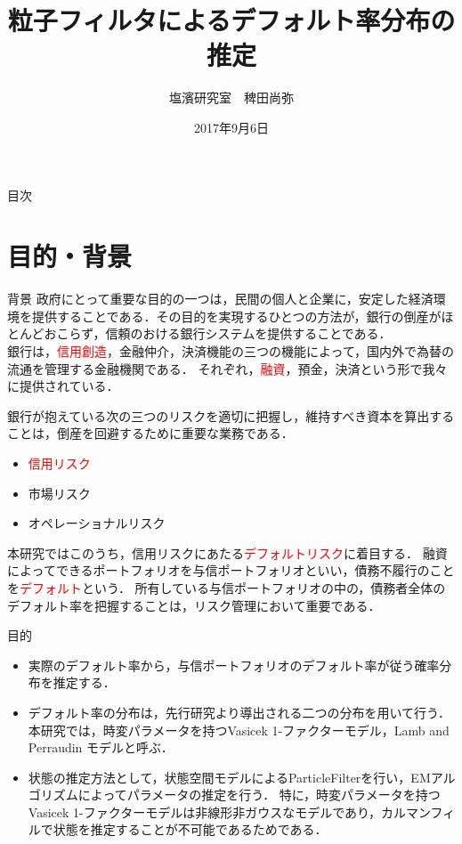 \documentclass[dvipdfmx]{beamer}
\title[タイトル]{粒子フィルタによるデフォルト率分布の推定}
\author[発表者名]{塩濱研究室　稗田尚弥}
\institute[所属]{東京理科大学大学院工学研究科経営工学専攻1年 \\ 学籍番号 4417621}
\date[日付]{2017年9月6日}
\begin{document}
\begin{frame}[plain]
\titlepage
\end{frame}


\begin{frame}{目次}
\tableofcontents
\end{frame}

\section{目的・背景}
\begin{frame}{背景}
政府にとって重要な目的の一つは，民間の個人と企業に，安定した経済環境を提供することである．その目的を実現するひとつの方法が，銀行の倒産がほとんどおこらず，信頼のおける銀行システムを提供することである．\\
銀行は，\textcolor{red}{信用創造}，金融仲介，決済機能の三つの機能によって，国内外で為替の流通を管理する金融機関である．
それぞれ，\textcolor{red}{融資}，預金，決済という形で我々に提供されている．\\
\end{frame}

\begin{frame}
銀行が抱えている次の三つのリスクを適切に把握し，維持すべき資本を算出することは，倒産を回避するために重要な業務である．
\begin{block}{}
\begin{itemize}
 \item \textcolor{red}{信用リスク} 
 \item 市場リスク 
 \item オペレーショナルリスク 
\end{itemize}
\end{block}
本研究ではこのうち，信用リスクにあたる\textcolor{red}{デフォルトリスク}に着目する．
融資によってできるポートフォリオを与信ポートフォリオといい，債務不履行のことを\textcolor{red}{デフォルト}という．
所有している与信ポートフォリオの中の，債務者全体のデフォルト率を把握することは，リスク管理において重要である．
\end{frame}

\begin{frame}{目的}
\begin{itemize}
\item
実際のデフォルト率から，与信ポートフォリオのデフォルト率が従う確率分布を推定する．
\item
デフォルト率の分布は，先行研究より導出される二つの分布を用いて行う．本研究では，時変パラメータを持つVasicek 1-ファクターモデル，Lamb and Perraudin モデルと呼ぶ．
\item
状態の推定方法として，状態空間モデルによるParticleFilterを行い，EMアルゴリズムによってパラメータの推定を行う．
特に，時変パラメータを持つVasicek 1-ファクターモデルは非線形非ガウスなモデルであり，カルマンフィルで状態を推定することが不可能であるためである．
\end{itemize}
\end{frame}
\end{document}
